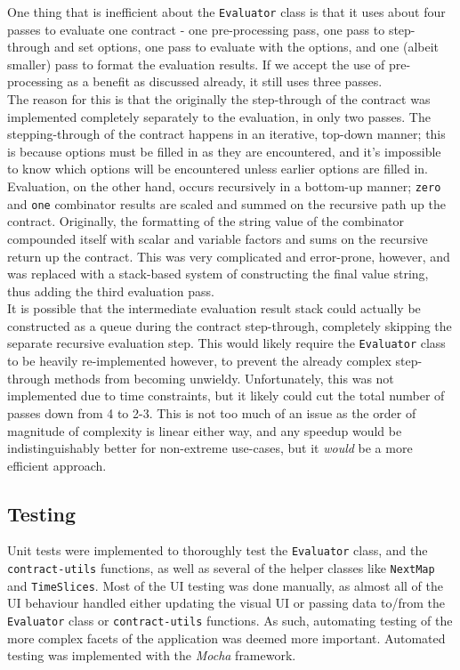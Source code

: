 One thing that is inefficient about the \texttt{Evaluator} class is that it uses about four passes to evaluate one contract - one pre-processing pass, one pass to step-through and set options, one pass to evaluate with the options, and one (albeit smaller) pass to format the evaluation results. If we accept the use of pre-processing as a benefit as discussed already, it still uses three passes. \\

The reason for this is that the originally the step-through of the contract was implemented completely separately to the evaluation, in only two passes. The stepping-through of the contract happens in an iterative, top-down manner; this is because options must be filled in as they are encountered, and it's impossible to know which options will be encountered unless earlier options are filled in. Evaluation, on the other hand, occurs recursively in a bottom-up manner; \texttt{zero} and \texttt{one} combinator results are scaled and summed on the recursive path up the contract. Originally, the formatting of the string value of the combinator compounded itself with scalar and variable factors and sums on the recursive return up the contract. This was very complicated and error-prone, however, and was replaced with a stack-based system of constructing the final value string, thus adding the third evaluation pass. \\

It is possible that the intermediate evaluation result stack could actually be constructed as a queue during the contract step-through, completely skipping the separate recursive evaluation step. This would likely require the \texttt{Evaluator} class to be heavily re-implemented however, to prevent the already complex step-through methods from becoming unwieldy. Unfortunately, this was not implemented due to time constraints, but it likely could cut the total number of passes down from 4 to 2-3. This is not too much of an issue as the order of magnitude of complexity is linear either way, and any speedup would be indistinguishably better for non-extreme use-cases, but it \textit{would} be a more efficient approach.


\subsection{Testing}

Unit tests were implemented to thoroughly test the \texttt{Evaluator} class, and the \texttt{contract-utils} functions, as well as several of the helper classes like \texttt{NextMap} and \texttt{TimeSlices}. Most of the UI testing was done manually, as almost all of the UI behaviour handled either updating the visual UI or passing data to/from the \texttt{Evaluator} class or \texttt{contract-utils} functions. As such, automating testing of the more complex facets of the application was deemed more important. Automated testing was implemented with the \textit{Mocha} framework.

